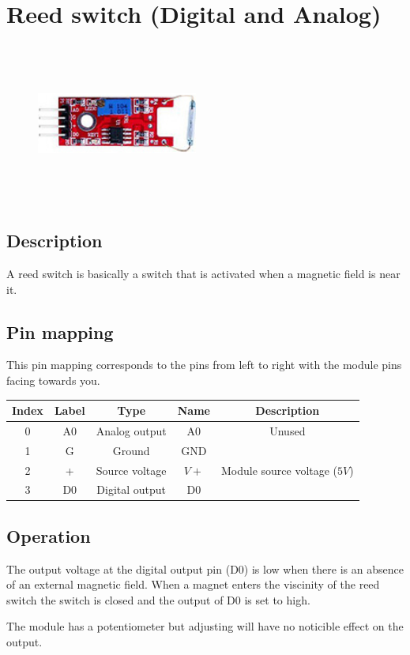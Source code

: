 \section{Reed switch (Digital and Analog)}
\begin{figure}[H]
    \centering
    \includegraphics[angle=0, keepaspectratio=true, scale=1, width=200px, height=200px]{images/reed_analog_digital.jpg}
\end{figure}
\subsection*{Description}
A reed switch is basically a switch that is activated when a magnetic field is near it.
\subsection*{Pin mapping}
This pin mapping corresponds to the pins from left to right with the module pins facing towards you.
\begin{table}[H]
    \centering
    \begin{tabular}{|c|c|c|c|c|}
    \hline
    Index &Label &Type &Name &Description\\ \hline
    0 &A0 &Analog output &A0 &Unused\\ \hline
    1 &G &Ground &GND &\\ \hline
    2 &+ &Source voltage &$V+$ &Module source voltage ($5V$)\\ \hline
    3 &D0 &Digital output &D0 &\\ \hline
    \end{tabular}
\end{table}
\subsection*{Operation}
The output voltage at the digital output pin (D0) is low when there is an absence of an external magnetic field. When a magnet enters the viscinity of the reed switch the switch is closed and the output of D0 is set to high.

The module has a potentiometer but adjusting will have no noticible effect on the output.
%